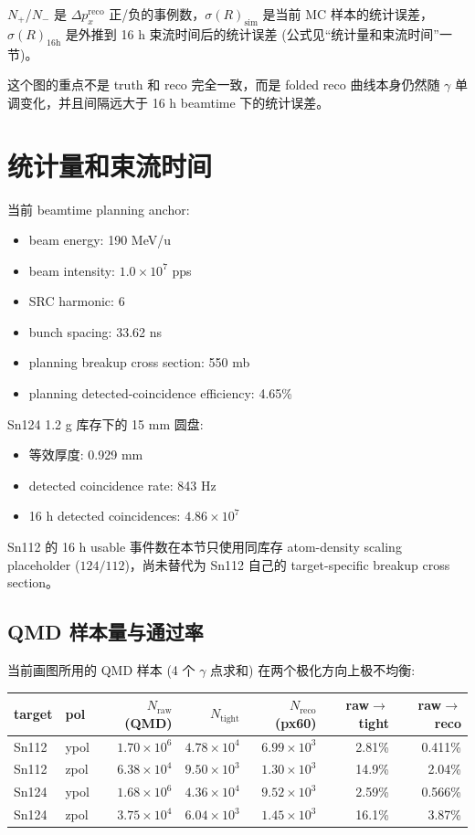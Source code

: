 \documentclass[a4paper,11pt]{article}
\begin{document}
$N_{+}$/$N_{-}$ 是 $\Delta p_x^{\mathrm{reco}}$ 正/负的事例数，$\sigma(R)_{\mathrm{sim}}$ 是当前 MC 样本的统计误差，$\sigma(R)_{16\mathrm{h}}$ 是外推到 16 h 束流时间后的统计误差 (公式见“统计量和束流时间”一节)。

这个图的重点不是 truth 和 reco 完全一致，而是 folded reco 曲线本身仍然随 $\gamma$ 单调变化，并且间隔远大于 16 h beamtime 下的统计误差。

\section{统计量和束流时间}

当前 beamtime planning anchor:
\begin{itemize}
  \item beam energy: 190 MeV/u
  \item beam intensity: $1.0\times 10^7$ pps
  \item SRC harmonic: 6
  \item bunch spacing: 33.62 ns
  \item planning breakup cross section: 550 mb
  \item planning detected-coincidence efficiency: 4.65\%
\end{itemize}

Sn124 1.2 g 库存下的 15 mm 圆盘:
\begin{itemize}
  \item 等效厚度: 0.929 mm
  \item detected coincidence rate: 843 Hz
  \item 16 h detected coincidences: $4.86\times 10^7$
\end{itemize}
Sn112 的 16 h usable 事件数在本节只使用同库存 atom-density scaling placeholder ($124/112$)，尚未替代为 Sn112 自己的 target-specific breakup cross section。

\subsection{QMD 样本量与通过率}

当前画图所用的 QMD 样本 (4 个 $\gamma$ 点求和) 在两个极化方向上极不均衡:

\begin{table}[H]
\centering
\begin{tabular}{llrrrrr}
\toprule
target & pol & $N_{\mathrm{raw}}$ (QMD) & $N_{\mathrm{tight}}$ & $N_{\mathrm{reco}}$(px60) & raw$\to$tight & raw$\to$reco \\
\midrule
Sn112 & ypol & $1.70\times10^6$ & $4.78\times10^4$ & $6.99\times10^3$ & 2.81\% & 0.411\% \\
Sn112 & zpol & $6.38\times10^4$ & $9.50\times10^3$ & $1.30\times10^3$ & 14.9\% & 2.04\% \\
Sn124 & ypol & $1.68\times10^6$ & $4.36\times10^4$ & $9.52\times10^3$ & 2.59\% & 0.566\% \\
Sn124 & zpol & $3.75\times10^4$ & $6.04\times10^3$ & $1.45\times10^3$ & 16.1\% & 3.87\% \\
\bottomrule
\end{tabular}
\end{table}
\end{document}
